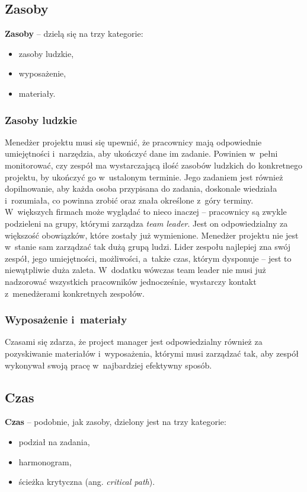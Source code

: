 \documentclass[oneside,polski,logo]{amuthesis}
\begin{document}
\subsection {Zasoby}
\textbf{Zasoby} – dzielą się na trzy kategorie:
\begin{itemize}
	\item zasoby ludzkie,
	\item wyposażenie,
	\item materiały.
\end{itemize}
\subsubsection {Zasoby ludzkie}

Menedżer projektu musi się upewnić, że pracownicy mają odpowiednie umiejętności i~narzędzia, aby ukończyć dane im zadanie. Powinien w~pełni monitorować, czy zespół ma wystarczającą ilość zasobów ludzkich do konkretnego projektu, by ukończyć go w~ustalonym terminie. Jego zadaniem jest również dopilnowanie, aby każda osoba przypisana do zadania, doskonale wiedziała i~rozumiała, co powinna zrobić oraz znała określone z~góry terminy. W~większych firmach może wyglądać to nieco inaczej – pracownicy są zwykle podzieleni na grupy, którymi zarządza \emph{team leader}. Jest on odpowiedzialny za większość obowiązków, które zostały już wymienione. Menedżer projektu nie jest w~stanie sam zarządzać tak dużą grupą ludzi. Lider zespołu najlepiej zna swój zespół, jego umiejętności, możliwości, a~także czas, którym dysponuje – jest to niewątpliwie duża zaleta. W~dodatku wówczas team leader nie musi już nadzorować wszystkich pracowników jednocześnie, wystarczy kontakt z~menedżerami konkretnych zespołów.

\subsubsection {Wyposażenie i~materiały}
Czasami się zdarza, że project manager jest odpowiedzialny również za pozyskiwanie materiałów i~wyposażenia, którymi musi zarządzać tak, aby zespół wykonywał swoją pracę w~najbardziej efektywny sposób.

\subsection {Czas}
\textbf{Czas} – podobnie, jak zasoby, dzielony jest na trzy kategorie:
\begin{itemize}
	\item podział na zadania,
	\item harmonogram,
	\item ścieżka krytyczna (ang. \emph{critical path}).
\end{itemize}
\end{document}
